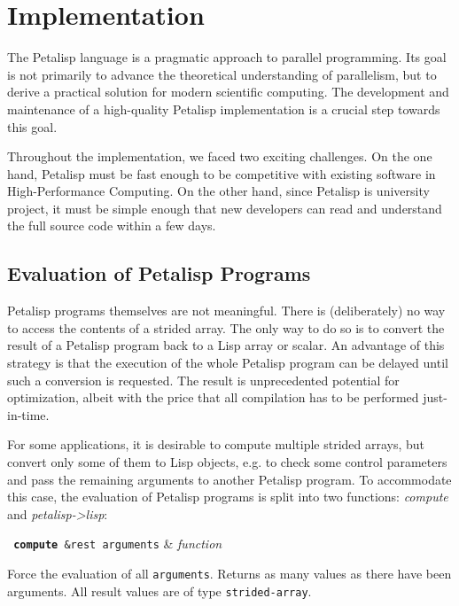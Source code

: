 \section{Implementation}
\label{sec:implementation}

The Petalisp language is a pragmatic approach to parallel programming. Its
goal is not primarily to advance the theoretical understanding of
parallelism, but to derive a practical solution for modern scientific
computing. The development and maintenance of a high-quality Petalisp
implementation is a crucial step towards this goal.

Throughout the implementation, we faced two exciting challenges. On the one
hand, Petalisp must be fast enough to be competitive with existing software
in High-Performance Computing. On the other hand, since Petalisp is
university project, it must be simple enough that new developers can read
and understand the full source code within a few days.

\subsection{Evaluation of Petalisp Programs}

Petalisp programs themselves are not meaningful. There is (deliberately) no
way to access the contents of a strided array. The only way to do so is to
convert the result of a Petalisp program back to a Lisp array or scalar. An
advantage of this strategy is that the execution of the whole Petalisp
program can be delayed until such a conversion is requested. The result is
unprecedented potential for optimization, albeit with the price that all
compilation has to be performed just-in-time.

For some applications, it is desirable to compute multiple strided arrays,
but convert only some of them to Lisp objects, e.g. to check some control
parameters and pass the remaining arguments to another Petalisp program. To
accommodate this case, the evaluation of Petalisp programs is split into
two functions: \emph{compute} and \emph{petalisp->lisp}:

\begin{function}
  \texttt{ \textbf{compute} \&rest arguments} & \textsl{function} \\
\end{function}

Force the evaluation of all \texttt{arguments}. Returns as many values as
there have been arguments. All result values are of type
\texttt{strided-array}.

